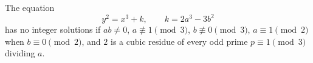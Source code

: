 \begin{proposition}
    The equation
\[
    y^2=x^3+k,\qquad k=2a^3-3b^2
\]
    has no integer solutions if $ab\ne0$, $a\not\equiv1\pmod3$, $b\not\equiv0\pmod3$, $a\equiv1\pmod2$ when $b\equiv0\pmod2$, and $2$ is a cubic residue of every odd prime $p\equiv1\pmod3$ dividing $a$.
\end{proposition}
